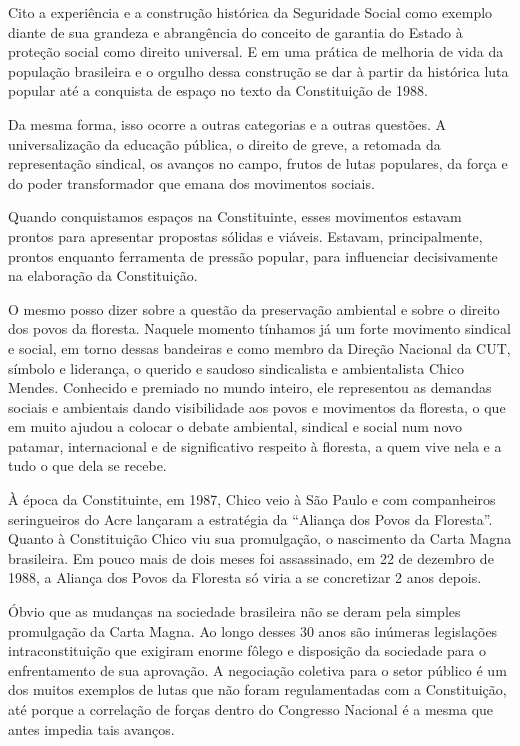Cito a experiência e a construção histórica da Seguridade Social como
exemplo diante de sua grandeza e abrangência do conceito de garantia do
Estado à proteção social como direito universal. E em uma prática de
melhoria de vida da população brasileira e o orgulho dessa construção se
dar à partir da histórica luta popular até a conquista de espaço no
texto da Constituição de 1988.

Da mesma forma, isso ocorre a outras categorias e a outras questões. A
universalização da educação pública, o direito de greve, a retomada da
representação sindical, os avanços no campo, frutos de lutas populares,
da força e do poder transformador que emana dos movimentos sociais.

Quando conquistamos espaços na Constituinte, esses movimentos estavam
prontos para apresentar propostas sólidas e viáveis. Estavam,
principalmente, prontos enquanto ferramenta de pressão popular, para
influenciar decisivamente na elaboração da Constituição.

O mesmo posso dizer sobre a questão da preservação ambiental e sobre o
direito dos povos da floresta. Naquele momento tínhamos já um forte
movimento sindical e social, em torno dessas bandeiras e como membro da
Direção Nacional da CUT, símbolo e liderança, o querido e saudoso
sindicalista e ambientalista Chico Mendes. Conhecido e premiado no mundo
inteiro, ele representou as demandas sociais e ambientais dando
visibilidade aos povos e movimentos da floresta, o que em muito ajudou a
colocar o debate ambiental, sindical e social num novo patamar,
internacional e de significativo respeito à floresta, a quem vive nela e
a tudo o que dela se recebe.

À época da Constituinte, em 1987, Chico veio à São Paulo e com
companheiros seringueiros do Acre lançaram a estratégia da ``Aliança dos
Povos da Floresta''. Quanto à Constituição Chico viu sua promulgação, o
nascimento da Carta Magna brasileira. Em pouco mais de dois meses foi
assassinado, em 22 de dezembro de 1988, a Aliança dos Povos da Floresta
só viria a se concretizar 2 anos depois.

Óbvio que as mudanças na sociedade brasileira não se deram pela simples
promulgação da Carta Magna. Ao longo desses 30 anos são inúmeras
legislações intraconstituição que exigiram enorme fôlego e disposição
da sociedade para o enfrentamento de sua aprovação. A negociação
coletiva para o setor público é um dos muitos exemplos de lutas que não
foram regulamentadas com a Constituição, até porque a correlação de
forças dentro do Congresso Nacional é a mesma que antes impedia tais
avanços.


